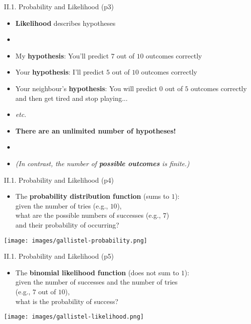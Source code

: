 \documentclass[handout]{beamer}
\newcommand{\strong}[1]{\textbf{\color{teal} #1}}
\newcommand{\stronger}[1]{\textbf{\color{purple} #1}}
\begin{document}
\begin{frame}{II.1. Probability and Likelihood (p3)}
\begin{itemize}
\item \stronger{Likelihood} describes hypotheses
\item[]
\item My \strong{hypothesis}: You'll predict $7$ out of $10$ outcomes correctly
\item Your \strong{hypothesis}: I'll predict $5$ out of $10$ outcomes correctly
\item Your neighbour's \strong{hypothesis}: You will predict $0$ out of $5$ outcomes correctly and then get tired and stop playing...
\item \emph{etc.}
\item \strong{There are an unlimited number of hypotheses!}
\item[]
\item[] \emph{(In contrast, the number of \strong{possible outcomes} is finite.)}
\end{itemize}
\end{frame}
\begin{frame}{II.1. Probability and Likelihood (p4)}
\begin{itemize}
\item The \stronger{probability distribution function} (sums to $1$):\\
given the number of tries (e.g., $10$),\\
what are the possible numbers of successes (e.g., $7$)\\
and their probability of occurring? \\
\end{itemize}
\begin{center}
\texttt{[image: images/gallistel-probability.png]}\\
\end{center}
\end{frame}
\begin{frame}{II.1. Probability and Likelihood (p5)}
\begin{itemize}
\item The \stronger{binomial likelihood function} (does not sum to $1$):\\
given the number of successes and the number of tries\\
(e.g., $7$ out of $10$),\\
what is the probability of success? \\
\end{itemize}
\begin{center}
\texttt{[image: images/gallistel-likelihood.png]}
\end{center}
\end{frame}
\end{document}
